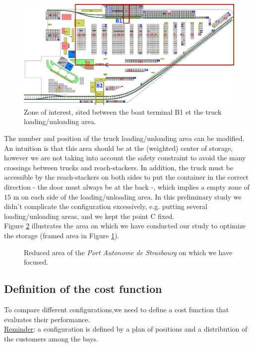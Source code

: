 \documentclass{article}
\newcommand{\PAS}{\emph{Port Autonome de Strasbourg }}
\begin{document}
\begin{figure}[!htb]
\centering
\includegraphics[width=\linewidth]{images/Plan_Terminal_encadre.png}
\caption{Zone of interest, sited between the boat terminal B1 et the truck loading/unloading area.}
\label{fig:pas_config_encadre}
\end{figure}

The number and position of the truck loading/unloading area can be modified.
An intuition is that this area should be at the (weighted) center of storage, however we are not taking into account the safety constraint to avoid the many crossings between trucks and reach-stackers. 
In addition, the truck must be accessible by the reach-stackers on both sides to put the container in the correct direction - the door must always be at the back -, which implies a empty zone of $15$ m on each side of the loading/unloading area. 
In this preliminary study we didn't complicate the configuration excessively, e.g. putting several loading/unloading areas, and we kept the point C fixed. \\
Figure \ref{fig:zone_reduced} illustrates the area on which we have conducted our study to optimize the storage (framed area in Figure \ref{fig:pas_config_encadre}).

\begin{figure}[!htb]
\centering

\caption{Reduced area of the \PAS on which we have focused.}
\label{fig:zone_reduced} 
\end{figure}




\subsection{Definition of the cost function}

To compare different configurations,we need to define a cost function that evaluates their performance. \\ 
\underline{Reminder}: a configuration is defined by a plan of positions and a distribution of the customers among the bays. 
\end{document}
